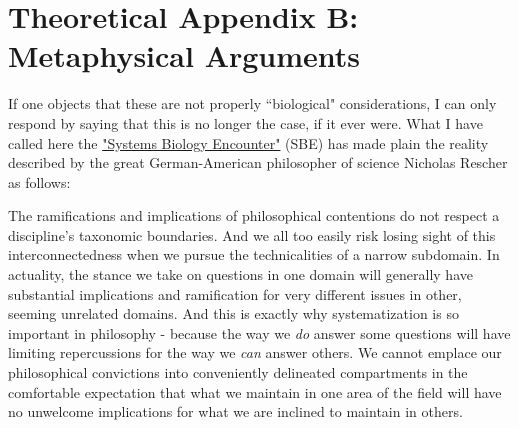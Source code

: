 \chapter{Theoretical Appendix B: Metaphysical Arguments}


If one objects that these are not properly ``biological" considerations, I can only respond by saying that this is no longer the case, if it ever were. What I have called here the \hyperref[SBE]{"Systems Biology Encounter"} (SBE) has made plain the reality described by the great German-American philosopher of science Nicholas Rescher as follows:

\begin{longquote}
The ramifications and implications of philosophical contentions do not respect a discipline's taxonomic boundaries. And we all too easily risk losing sight of this interconnectedness when we pursue the technicalities of a narrow subdomain. In actuality, the stance we take on questions in one domain will generally have substantial implications and ramification for very different issues in other, seeming unrelated domains. And this is exactly why systematization is so important in philosophy - because the way we \textit{do} answer some questions will have limiting repercussions for the way we \textit{can} answer others. We cannot emplace our philosophical convictions into conveniently delineated compartments in the comfortable expectation that what we maintain in one area of the field will have no unwelcome implications for what we are inclined to maintain in others.
\cite[p.97]{Rescher2005}
\end{longquote}

